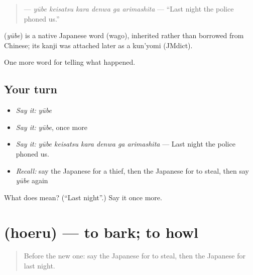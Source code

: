 \begin{quote}
\textbf{   } — \emph{yūbe keisatsu kara denwa ga arimashita} — \textquotedblleft{}Last night the police phoned us.\textquotedblright{}
\end{quote}

\begin{cousinweb}
\textbf{} (\emph{yūbe}) is a native Japanese word (wago), inherited rather than borrowed from Chinese; its kanji was attached later as a kun'yomi (JMdict).
\end{cousinweb}

\begin{grammarlens}[title={What you've built}]
One more word for telling what happened.
\end{grammarlens}

\subsection*{Your turn}
\begin{itemize}
\raggedright
  \item \emph{Say it:} \emph{yūbe}
  \item \emph{Say it:} \emph{yūbe}, once more
  \item \emph{Say it:} \emph{yūbe keisatsu kara denwa ga arimashita} — Last night the police phoned us.
  \item \emph{Recall:} say the Japanese for a thief, then the Japanese for to steal, then say \emph{yūbe} again
\end{itemize}

\begin{tcolorbox}[breakable,colback=teal!4,colframe=teal!35!black,title={Before you move on}]
What does  mean? (\textquotedblleft{}Last night\textquotedblright{}.) Say it once more.
\end{tcolorbox}
\section[\texorpdfstring{\ja{ほえる} (hoeru)}{ほえる (hoeru)}]{ (hoeru) — to bark; to howl}

\label{lesson:JA-C269-hoeru}



\begin{quote}
Before the new one: say the Japanese for to steal, then the Japanese for last night.
\end{quote}


